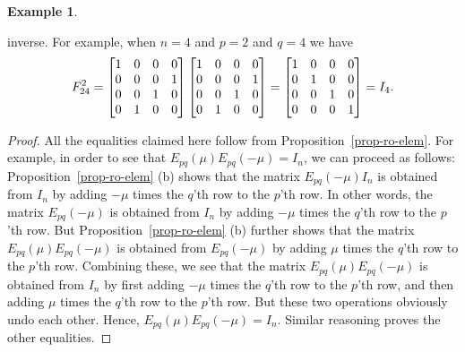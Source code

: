 \documentclass[reqno]{amsart}
\theoremstyle{definition}
\newtheorem{example}[theorem]{Example}
\begin{document}
\begin{example}
\begin{itemize}
   inverse.  For example, when $n=4$ and $p=2$ and $q=4$ we have 
   \[ 
    F_{24}^2 =
    \left[\begin{matrix} 1&0&0&0 \\ 0&0&0&1 \\ 0&0&1&0 \\ 0&1&0&0 \end{matrix}\right]
    \left[\begin{matrix} 1&0&0&0 \\ 0&0&0&1 \\ 0&0&1&0 \\ 0&1&0&0 \end{matrix}\right]
    =
    \left[\begin{matrix} 1&0&0&0 \\ 0&1&0&0 \\ 0&0&1&0 \\ 0&0&0&1 \end{matrix}\right]
    = I_4.
   \] 
 \end{itemize}
\end{example}

\begin{proof}
All the equalities claimed here follow from Proposition~\ref{prop-ro-elem}.
For example, in order to see that $E_{pq}(\mu) E_{pq}(-\mu) = I_n$, we can
proceed as follows: Proposition~\ref{prop-ro-elem} (b) shows that the
matrix $E_{pq}(-\mu) I_n$ is obtained from $I_n$ by adding $-\mu$ times
the $q$'th row to the $p$'th row. In other words, the matrix $E_{pq}(-\mu)$
is obtained from $I_n$ by adding $-\mu$ times the $q$'th row to the $p$'th
row. But Proposition~\ref{prop-ro-elem} (b) further shows that the matrix
$E_{pq}(\mu) E_{pq}(-\mu)$ is obtained from $E_{pq}(-\mu)$ by adding $\mu$
times the $q$'th row to the $p$'th row. Combining these, we see that the
matrix $E_{pq}(\mu) E_{pq}(-\mu)$ is obtained from $I_n$ by first adding
$-\mu$ times the $q$'th row to the $p$'th row, and then adding $\mu$ times
the $q$'th row to the $p$'th row. But these two operations obviously undo
each other. Hence, $E_{pq}(\mu) E_{pq}(-\mu) = I_n$.
Similar reasoning proves the other equalities.
\end{proof}
\end{document}
